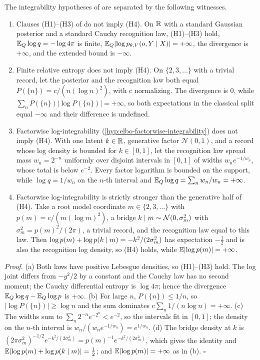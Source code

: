 The integrability hypotheses of  are separated by the following witnesses.
\begin{enumerate}
\item[(a)] Clauses (H1)--(H3) of  do not imply (H4). On $\mathbb R$ with a standard
Gaussian posterior and a standard Cauchy recognition law, (H1)--(H3) hold,
$\mathbb E_Q\log q=-\log4\pi$ is finite, $\mathbb E_Q\lvert\log p_{\theta,V}(o,Y\mid X)\rvert=+\infty$, the divergence is
$+\infty$, and the extended bound is $-\infty$.
\item[(b)] Finite relative entropy does not imply (H4). On $\{2,3,\ldots\}$ with a trivial record, let the
posterior and the recognition law both equal $P(\{n\})=\mathrm c/(n(\log n)^2)$, with $\mathrm c$ normalizing.
The divergence is $0$, while $\sum_nP(\{n\})\lvert\log P(\{n\})\rvert=+\infty$, so both expectations in the
classical split equal $-\infty$ and their difference is undefined.
\item[(c)] Factorwise log-integrability (\cref{hyp:elbo-factorwise-integrability}) does not imply (H4). With
one latent $k\in\mathbb R$, generative factor $\mathcal N(0,1)$, and a record whose log density is bounded for
$k\in[0,1]$, let the recognition law spread mass $w_n=2^{-n}$ uniformly over disjoint intervals in $[0,1]$ of
widths $w_ne^{-1/w_n}$, whose total is below $e^{-2}$. Every factor logarithm is bounded on the support, while
$\log q=1/w_n$ on the $n$-th interval and $\mathbb E_Q\log q=\sum_nw_n/w_n=+\infty$.
\item[(d)] Factorwise log-integrability is strictly stronger than the generative half of (H4).
Take a root model coordinate $m\in\{2,3,\ldots\}$ with $p(m)=\mathrm c/(m(\log m)^2)$, a bridge
$k\mid m\sim\mathcal N(0,\sigma_m^2)$ with $\sigma_m^2=p(m)^2/(2\pi)$, a trivial record, and the recognition
law equal to this law. Then $\log p(m)+\log p(k\mid m)=-k^2/(2\sigma_m^2)$ has expectation $-\tfrac12$ and is
also the recognition log density, so (H4) holds, while $\mathbb E\lvert\log p(m)\rvert=+\infty$.
\end{enumerate}

\noindent\emph{Proof.}
(a) Both laws have positive Lebesgue densities, so (H1)--(H3) hold. The log joint differs from $-y^2/2$ by a
constant and the Cauchy law has no second moment; the Cauchy differential entropy is $\log4\pi$; hence the
divergence $\mathbb E_Q\log q-\mathbb E_Q\log p$ is $+\infty$. (b) For large $n$, $P(\{n\})\leq1/n$, so
$\lvert\log P(\{n\})\rvert\geq\log n$ and the sum dominates $\mathrm c\sum_n1/(n\log n)=+\infty$. (c) The widths sum
to $\sum_n2^{-n}e^{-2^n}<e^{-2}$, so the intervals fit in $[0,1]$; the density on the $n$-th interval is
$w_n/(w_ne^{-1/w_n})=e^{1/w_n}$. (d) The bridge density at $k$ is
$(2\pi\sigma_m^2)^{-1/2}e^{-k^2/(2\sigma_m^2)}=p(m)^{-1}e^{-k^2/(2\sigma_m^2)}$, which gives the identity and
$\mathbb E\lvert\log p(m)+\log p(k\mid m)\rvert=\tfrac12$; and $\mathbb E\lvert\log p(m)\rvert=+\infty$ as in (b). \hfill$\square$
